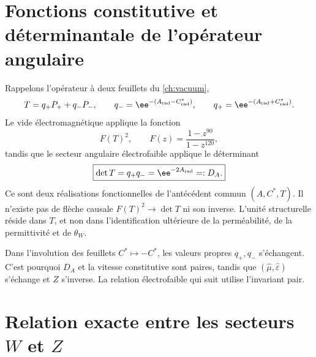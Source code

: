 \label{ch:ew}

\section{Fonctions constitutive et déterminantale de l'opérateur angulaire}

Rappelons l'opérateur à deux feuillets du \cref{ch:vacuum},
\begin{equation}
\label{eq:ew-angular-operator}
T=q_+P_+ +q_-P_-,
\qquad
q_-=\ee^{-(A_{\rm rad}-C^*_{\rm rad})},
\qquad
q_+=\ee^{-(A_{\rm rad}+C^*_{\rm rad})}.
\end{equation}
Le vide électromagnétique applique la fonction
\begin{equation}
\label{eq:ew-vacuum-reader}
F(T)^2,
\qquad
F(z)=\frac{1-z^{90}}{1-z^{120}},
\end{equation}
tandis que le secteur angulaire électrofaible applique le déterminant
\begin{equation}
\label{eq:ew-determinant-reader}
\boxed{
\det T=q_+q_-=\ee^{-2A_{\rm rad}}=:D_A.}
\end{equation}
Ce sont deux réalisations fonctionnelles de l'antécédent commun \((A,C^*,T)\). Il n'existe pas de
flèche causale \(F(T)^2\to\det T\) ni son inverse. L'unité structurelle
réside dans \(T\), et non dans l'identification ultérieure de la perméabilité, de la permittivité et de
\(\theta_W\).

Dans l'involution des feuillets \(C^*\mapsto-C^*\), les valeurs propres
\(q_+,q_-\) s'échangent. C'est pourquoi \(D_A\) et la vitesse constitutive
sont paires, tandis que \((\widehat\mu,\widehat\varepsilon)\) s'échange et
\(\widehat Z\) s'inverse. La relation électrofaible qui suit utilise
l'invariant pair.

\section{Relation exacte entre les secteurs \(W\) et \(Z\)}

